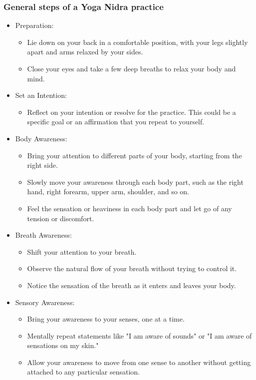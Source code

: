 \begin{frame}[fragile]\frametitle{General steps of a Yoga Nidra practice}
	\begin{itemize}
	\item Preparation:
	\begin{itemize}
		\item Lie down on your back in a comfortable position, with your legs slightly apart and arms relaxed by your sides.
		\item Close your eyes and take a few deep breaths to relax your body and mind.
	\end{itemize}
		
	\item Set an Intention:
	\begin{itemize}
		\item Reflect on your intention or resolve for the practice. This could be a specific goal or an affirmation that you repeat to yourself.
	\end{itemize}
		
	\item Body Awareness:
	\begin{itemize}
		\item Bring your attention to different parts of your body, starting from the right side.
		\item Slowly move your awareness through each body part, such as the right hand, right forearm, upper arm, shoulder, and so on.
		\item Feel the sensation or heaviness in each body part and let go of any tension or discomfort.
	\end{itemize}
		
	\item Breath Awareness:
	\begin{itemize}
		\item Shift your attention to your breath.
		\item Observe the natural flow of your breath without trying to control it.
		\item Notice the sensation of the breath as it enters and leaves your body.
	\end{itemize}
		
	\item Sensory Awareness:
	\begin{itemize}
		\item Bring your awareness to your senses, one at a time.
		\item Mentally repeat statements like "I am aware of sounds" or "I am aware of sensations on my skin."
		\item Allow your awareness to move from one sense to another without getting attached to any particular sensation.
	\end{itemize}		
	\end{itemize}

\end{frame}


